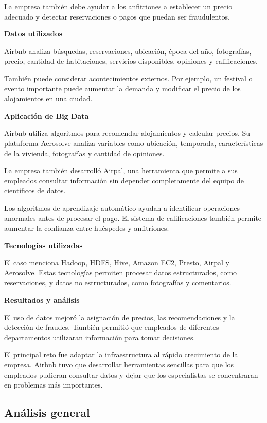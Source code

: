La empresa también debe ayudar a los anfitriones a establecer un precio adecuado y detectar reservaciones o pagos que puedan ser fraudulentos.

\textbf{Datos utilizados}

Airbnb analiza búsquedas, reservaciones, ubicación, época del año, fotografías, precio, cantidad de habitaciones, servicios disponibles, opiniones y calificaciones.

También puede considerar acontecimientos externos. Por ejemplo, un festival o evento importante puede aumentar la demanda y modificar el precio de los alojamientos en una ciudad.

\textbf{Aplicación de Big Data}

Airbnb utiliza algoritmos para recomendar alojamientos y calcular precios. Su plataforma Aerosolve analiza variables como ubicación, temporada, características de la vivienda, fotografías y cantidad de opiniones.

La empresa también desarrolló Airpal, una herramienta que permite a sus empleados consultar información sin depender completamente del equipo de científicos de datos.

Los algoritmos de aprendizaje automático ayudan a identificar operaciones anormales antes de procesar el pago. El sistema de calificaciones también permite aumentar la confianza entre huéspedes y anfitriones.

\textbf{Tecnologías utilizadas}

El caso menciona Hadoop, HDFS, Hive, Amazon EC2, Presto, Airpal y Aerosolve. Estas tecnologías permiten procesar datos estructurados, como reservaciones, y datos no estructurados, como fotografías y comentarios.

\textbf{Resultados y análisis}

El uso de datos mejoró la asignación de precios, las recomendaciones y la detección de fraudes. También permitió que empleados de diferentes departamentos utilizaran información para tomar decisiones.

El principal reto fue adaptar la infraestructura al rápido crecimiento de la empresa. Airbnb tuvo que desarrollar herramientas sencillas para que los empleados pudieran consultar datos y dejar que los especialistas se concentraran en problemas más importantes.

\subsection{Análisis general}


